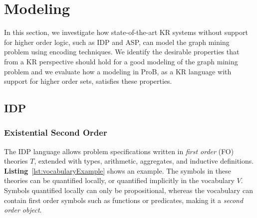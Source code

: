 \section{Modeling}\label{sec:modeling}
In this section, we investigate how state-of-the-art KR systems without support for higher order logic, such as IDP and ASP, can model the graph mining problem 
using encoding techniques.
We identify the desirable properties that from a KR perspective should hold for a good modeling of the graph mining problem and we evaluate how a modeling in ProB, as a KR language with support for higher order sets, satisfies these properties.

\subsection{IDP}
\subsubsection{Existential Second Order}
The IDP language allows problem specifications written in \emph{first order} (FO) theories $T$, extended with types, arithmetic, aggregates, and inductive definitions.
\textbf{Listing}~\ref{lst:vocabularyExample} shows an example.
The symbols in these theories can be quantified locally, or quantified implicitly in the vocabulary $V$.
Symbols quantified locally can only be propositional, whereas the vocabulary can contain first order symbols such as functions or predicates, making it a \emph{second order object}.

